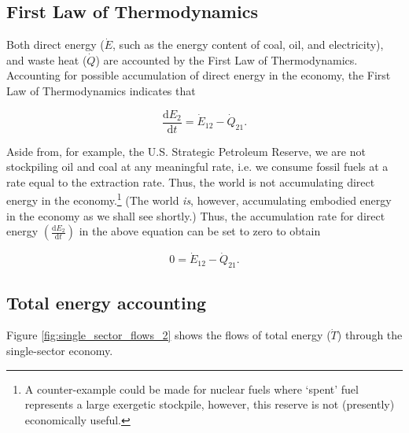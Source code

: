 \documentclass[authoryear,preprint,review,12pt]{elsarticle}
\begin{document}
\subsection{First Law of Thermodynamics}

Both direct energy ($\dot{E}$, such as the energy content of coal, oil, and electricity), and waste heat ($\dot{Q}$) are accounted by the First Law of Thermodynamics. Accounting for possible accumulation of direct energy in the economy, the First Law of Thermodynamics indicates that

\begin{equation} \label{eq:dE_2/dt_single_sector}
	\frac{\mathrm{d}E_{2}}{\mathrm{d}t} = \dot{E}_{12} - \dot{Q}_{21}.
\end{equation}

Aside from, for example, the U.S. Strategic Petroleum Reserve, we are not stockpiling oil and coal at any meaningful rate, i.e. we consume fossil fuels at a rate equal to the extraction rate. Thus, the world is not accumulating direct energy in the economy.\footnote{A counter-example could be made for nuclear fuels where `spent' fuel represents a large exergetic stockpile, however, this reserve is not (presently) economically useful.} (The world \emph{is}, however, accumulating embodied energy in the economy as we shall see shortly.) Thus, the accumulation rate for direct energy $\left(\frac{\mathrm{d}E_{2}}{\mathrm{d}t}\right)$ in the above equation can be set to zero to obtain

\begin{equation} \label{eq:single_sector_direct_energy_no_accumulation}
	0 = \dot{E}_{12} - \dot{Q}_{21}.
\end{equation}

\subsection{Total energy accounting}

Figure \ref{fig:single_sector_flows_2} shows the flows of total energy ($\dot{T}$) through the single-sector economy.
\end{document}
